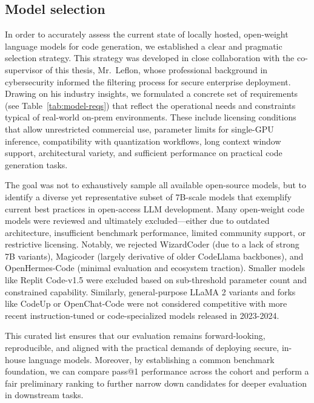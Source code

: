 \subsection{Model selection}
\label{subsection:model-selection}
In order to accurately assess the current state of locally hosted, open-weight language models for code generation, we established a clear and pragmatic selection strategy. This strategy was developed in close collaboration with the co-supervisor of this thesis, Mr.~Leflon, whose professional background in cybersecurity informed the filtering process for secure enterprise deployment. Drawing on his industry insights, we formulated a concrete set of requirements (see Table~\ref{tab:model-reqs}) that reflect the operational needs and constraints typical of real-world on-prem environments. These include licensing conditions that allow unrestricted commercial use, parameter limits for single-GPU inference, compatibility with quantization workflows, long context window support, architectural variety, and sufficient performance on practical code generation tasks.

The goal was not to exhaustively sample all available open-source models, but to identify a diverse yet representative subset of 7B-scale models that exemplify current best practices in open-access LLM development. Many open-weight code models were reviewed and ultimately excluded---either due to outdated architecture, insufficient benchmark performance, limited community support, or restrictive licensing. Notably, we rejected WizardCoder (due to a lack of strong 7B variants), Magicoder (largely derivative of older CodeLlama backbones), and OpenHermes-Code (minimal evaluation and ecosystem traction). Smaller models like Replit Code-v1.5 were excluded based on sub-threshold parameter count and constrained capability. Similarly, general-purpose LLaMA 2 variants and forks like CodeUp or OpenChat-Code were not considered competitive with more recent instruction-tuned or code-specialized models released in 2023-2024.

This curated list ensures that our evaluation remains forward-looking, reproducible, and aligned with the practical demands of deploying secure, in-house language models. Moreover, by establishing a common benchmark foundation, we can compare pass@1 performance across the cohort and perform a fair preliminary ranking to further narrow down candidates for deeper evaluation in downstream tasks.

